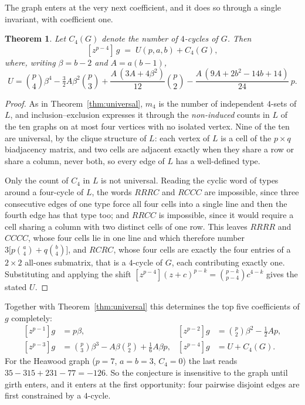 \documentclass[11pt]{article}
\newtheorem{theorem}{Theorem}
\theoremstyle{remark}
\begin{document}
The graph enters at the very next coefficient, and it does so through a single
invariant, with coefficient one.

\begin{theorem}\label{thm:c4}
Let $C_4(G)$ denote the number of $4$-cycles of $G$. Then
\[
[z^{p-4}]\,g \;=\; U(p,a,b)+C_4(G),
\]
where, writing $\beta=b-2$ and $A=a(b-1)$,
\[
U=\binom p4\beta^4-\tfrac32A\beta^2\binom p3
+\frac{A\,(3A+4\beta^2)}{12}\binom p2-\frac{A\,(9A+2b^2-14b+14)}{24}\,p .
\]
\end{theorem}

\begin{proof}
As in Theorem~\ref{thm:universal}, $m_4$ is the number of independent $4$-sets of
$L$, and inclusion--exclusion expresses it through the \emph{non-induced} counts
in $L$ of the ten graphs on at most four vertices with no isolated vertex. Nine
of the ten are universal, by the clique structure of $L$: each vertex of $L$ is a
cell of the $p\times q$ biadjacency matrix, and two cells are adjacent exactly
when they share a row or share a column, never both, so every edge of $L$ has a
well-defined type.

Only the count of $C_4$ in $L$ is not universal. Reading the cyclic word of types
around a four-cycle of $L$, the words $RRRC$ and $RCCC$ are impossible, since
three consecutive edges of one type force all four cells into a single line and
then the fourth edge has that type too; and $RRCC$ is impossible, since it would
require a cell sharing a column with two distinct cells of one row. This leaves
$RRRR$ and $CCCC$, whose four cells lie in one line and which therefore number
$3\bigl[p\binom a4+q\binom b4\bigr]$, and $RCRC$, whose four cells are exactly
the four entries of a $2\times2$ all-ones submatrix, that is a $4$-cycle of $G$,
each contributing exactly one. Substituting and applying the shift
$[z^{p-4}](z+c)^{p-k}=\binom{p-k}{p-4}c^{4-k}$ gives the stated $U$.
\end{proof}

Together with Theorem~\ref{thm:universal} this determines the top five
coefficients of $g$ completely:
\[
\begin{aligned}
{}[z^{p-1}]g&=p\beta, &
[z^{p-2}]g&=\binom p2\beta^2-\tfrac12Ap,\\
[z^{p-3}]g&=\binom p3\beta^3-A\beta\binom p2+\tfrac16A\beta p, &
[z^{p-4}]g&=U+C_4(G).
\end{aligned}
\]
For the Heawood graph ($p=7$, $a=b=3$, $C_4=0$) the last reads
$35-315+231-77=-126$. So the conjecture is insensitive to the graph until girth
enters, and it enters at the first opportunity: four pairwise disjoint edges are
first constrained by a $4$-cycle.
\end{document}
